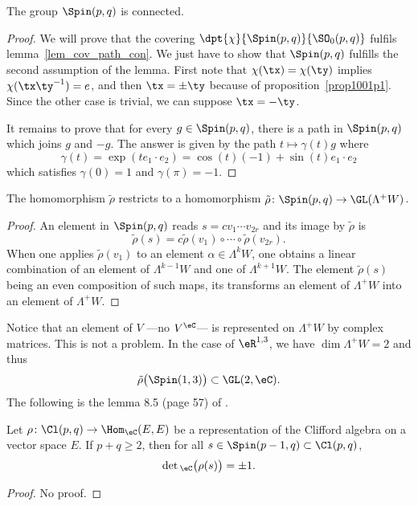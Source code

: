\begin{proposition}
 The group $\Spin(p,q)$ is connected.
\end{proposition}

\begin{proof}
We will prove that the covering $\dpt{\chi}{\Spin(p,q)}{\SO_0(p,q)}$ fulfils lemma~\ref{lem_cov_path_con}. We just have to show that $\Spin(p,q)$ fulfills the second assumption of the lemma. First note that $\chi(\tx)=\chi(\ty)$ implies $\chi(\tx\ty^{-1})=e$, and then $\tx=\pm\ty$ because of proposition~\ref{prop1001p1}. Since the other case is trivial, we can suppose $\tx=-\ty$.

It remains to prove that for every $g\in\Spin(p,q)$, there is a path in $\Spin(p,q)$ which joins $g$ and $-g$. The answer is given by the path $t\mapsto \gamma(t)g$ where
\[
\gamma(t)=\exp(te_1\cdot e_2)=\cos(t)(-1)+\sin(t)e_1\cdot e_2
\]
which satisfies $\gamma(0)=1$ and $\gamma(\pi)=-1$.
\end{proof}

\begin{proposition}

The homomorphism $\tilde\rho$ restricts to a homomorphism $\tilde\rho\colon \Spin(p,q)\to \GL(\Lambda^+W)$.
\end{proposition}

\begin{proof}
An element in $\Spin(p,q)$ reads $s=cv_1\cdots v_{2r}$ and its image by $\tilde\rho$ is
\[
  \tilde\rho(s)=c\tilde\rho(v_1)\circ \cdots \circ\tilde\rho(v_{2r}).
\]
When one applies $\tilde\rho(v_1)$ to an element $\alpha\in\Lambda^kW$, one obtains a linear combination of an element of $\Lambda^{k-1}W$ and one of $\Lambda^{k+1}W$. The element $\tilde\rho(s)$ being an even composition of such maps, its transforms an element of $\Lambda^+W$ into an element of $\Lambda^+W$.
\end{proof}

Notice that an element of $V$ ---no $V^{\eC}$--- is represented on $\Lambda^+W$ by complex matrices. This is not a problem. In the case of $\eR^{1,3}$, we have $\dim\Lambda^+W=2$ and thus
\[
  \tilde\rho\big( \Spin(1,3) \big)\subset \GL(2,\eC).
\]
The following is the lemma 8.5 (page 57) of \cite{Michelson}.

\begin{lemma}
Let $\rho\colon \Cl(p,q)\to \Hom_{\eC}(E,E)$ be a representation of the Clifford algebra on a vector space $E$. If $p+q\geq 2$, then for all $s\in\Spin(p-1,q)\subset \Cl(p,q) $,
\[
  \det{}_{\eC}\big( \rho(s) \big)=\pm 1.
\]

\end{lemma}
\begin{proof}
No proof.
\end{proof}

